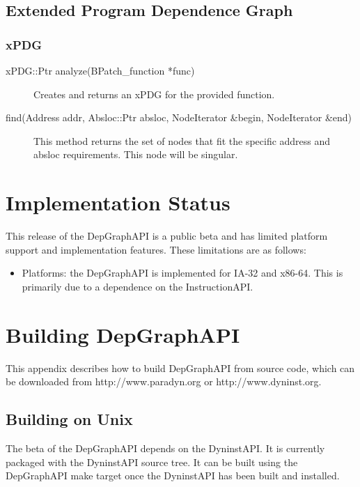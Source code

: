 \documentclass[12pt,titlepage]{article}
\begin{document}
\subsection{Extended Program Dependence Graph}
\subsubsection{xPDG}
\begin{description}
\item[xPDG::Ptr analyze(BPatch\_function *func)]
Creates and returns an xPDG for the provided function.
\item[find(Address addr, Absloc::Ptr absloc, NodeIterator \&begin, NodeIterator \&end) ]
This method returns the set of nodes that fit the specific address and absloc requirements. This node will be singular.
\end{description}

\section{Implementation Status}

This release of the DepGraphAPI is a public beta and has limited
platform support and implementation features. These limitations are as
follows:
\begin{itemize}
\item Platforms: the DepGraphAPI is implemented for IA-32 and
  x86-64. This is primarily due to a dependence on the InstructionAPI.
\end{itemize}


\section{Building DepGraphAPI}
This appendix describes how to build DepGraphAPI from source code,
which can be downloaded from http://www.paradyn.org or
http://www.dyninst.org.

\subsection{Building on Unix}
The beta of the DepGraphAPI depends on the DyninstAPI. It is currently
packaged with the DyninstAPI source tree. It can be built using the
DepGraphAPI make target once the DyninstAPI has been built and
installed.
\end{document}
